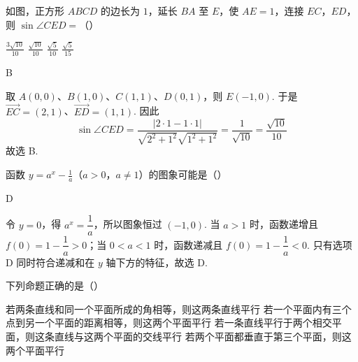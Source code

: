 \begin{problem}
如图，正方形 \(ABCD\) 的边长为 \(1\)，延长 \(BA\) 至 \(E\)，使 \(AE=1\)，连接 \(EC\)，\(ED\)，则 \(\sin \angle CED =\)（\quad）


\choices
    {\(\frac{3\sqrt{10}}{10}\)}
    {\(\frac{\sqrt{10}}{10}\)}
    {\(\frac{\sqrt{5}}{10}\)}
    {\(\frac{\sqrt{5}}{15}\)}
\end{problem}

\begin{answer}
B
\end{answer}

\begin{solution}
取 \(A(0,0)\)、\(B(1,0)\)、\(C(1,1)\)、\(D(0,1)\)，则 \(E(-1,0)\). 于是
\(\overrightarrow{EC}=(2,1)\)、\(\overrightarrow{ED}=(1,1)\). 因此
\[
\sin\angle CED
 =\frac{|2\cdot1-1\cdot1|}{\sqrt{2^2+1^2}\sqrt{1^2+1^2}}
 =\frac{1}{\sqrt{10}}=\frac{\sqrt{10}}{10}
\]
故选 B.
\end{solution}

\begin{problem}
函数 \( y = a^x - \frac{1}{a} \)（\(a > 0\)，\(a \neq 1\)）的图象可能是（\quad）

    {}
    {}
    {}
\end{problem}

\begin{answer}
D
\end{answer}

\begin{solution}
令 \(y=0\)，得 \(a^x=\dfrac1a\)，所以图象恒过 \((-1,0)\). 当 \(a>1\) 时，函数递增且
\(f(0)=1-\dfrac1a>0\)；当 \(0<a<1\) 时，函数递减且
\(f(0)=1-\dfrac1a<0\). 只有选项 D 同时符合递减和在 \(y\) 轴下方的特征，故选 D.
\end{solution}

\begin{problem}
下列命题正确的是（\quad）

\choices
    {若两条直线和同一个平面所成的角相等，则这两条直线平行}
    {若一个平面内有三个点到另一个平面的距离相等，则这两个平面平行}
    {若一条直线平行于两个相交平面，则这条直线与这两个平面的交线平行}
    {若两个平面都垂直于第三个平面，则这两个平面平行}
\end{problem}

